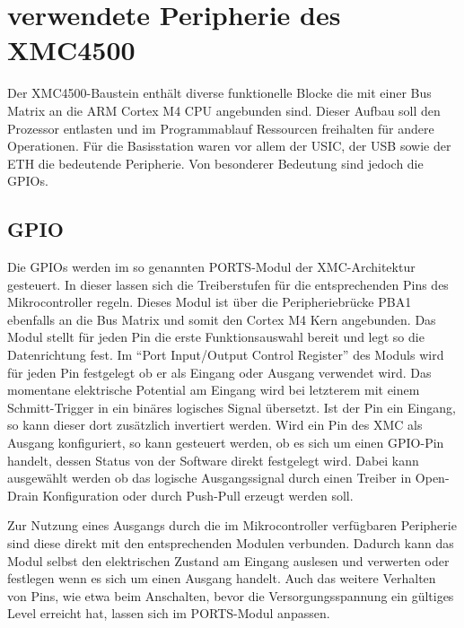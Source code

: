 \section{verwendete Peripherie des XMC4500}
Der XMC4500-Baustein enthält diverse funktionelle Blocke die mit einer Bus Matrix an die ARM Cortex M4 \ac{CPU} angebunden sind. Dieser Aufbau soll den Prozessor entlasten und im Programmablauf Ressourcen freihalten für andere Operationen.%
Für die Basisstation waren vor allem der \acs{USIC}, der \ac{USB} sowie der \ac{ETH} die bedeutende Peripherie. Von besonderer Bedeutung sind jedoch die \acp{GPIO}. %
\subsection{GPIO}
Die \acp{GPIO} werden im so genannten PORTS-Modul der XMC-Architektur gesteuert. In dieser lassen sich die Treiberstufen für die entsprechenden Pins des Mikrocontroller regeln. Dieses Modul ist über die Peripheriebrücke PBA1 ebenfalls an die Bus Matrix  und somit den Cortex M4 Kern angebunden.  %
Das Modul stellt für jeden Pin die erste Funktionsauswahl bereit und legt so die Datenrichtung fest. Im \enquote{Port Input/Output Control Register} des Moduls wird für jeden Pin festgelegt ob er als Eingang oder Ausgang verwendet wird. Das momentane elektrische Potential am Eingang wird bei letzterem mit einem Schmitt-Trigger in ein binäres logisches Signal übersetzt. Ist der Pin ein Eingang, so kann dieser dort zusätzlich invertiert werden. Wird ein Pin des XMC als Ausgang konfiguriert, so kann gesteuert werden, ob es sich um einen \ac{GPIO}-Pin handelt, dessen Status von der Software direkt festgelegt wird. Dabei kann ausgewählt werden ob das logische Ausgangssignal durch einen Treiber in Open-Drain Konfiguration oder durch Push-Pull erzeugt werden soll. 

Zur Nutzung eines Ausgangs durch die im Mikrocontroller verfügbaren Peripherie sind diese direkt mit den entsprechenden Modulen verbunden. Dadurch kann das Modul selbst den elektrischen Zustand am Eingang auslesen und verwerten oder festlegen wenn es sich um einen Ausgang handelt\cite{XMC-Reference}. 
Auch das weitere Verhalten von Pins, wie etwa  beim Anschalten, bevor die Versorgungsspannung ein gültiges Level erreicht hat, lassen sich im PORTS-Modul anpassen.

